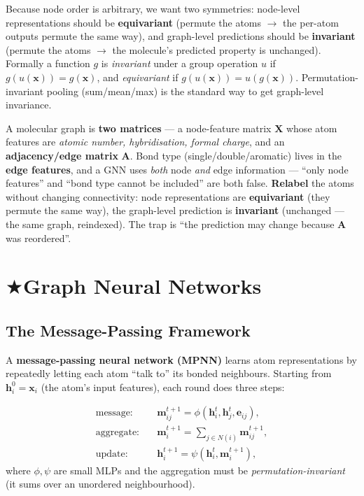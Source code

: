 \documentclass[11pt, oneside]{book}
\makeatletter
\newcommand{\starglyph}{\textcolor{stargold}{\ensuremath{\bigstar}}}
\newcommand{\starsec}[1]{%
  \texorpdfstring{\starglyph\hspace{0.4em}\textcolor{star@frame}{#1}}{#1}}
\newcommand{\xvec}{\mathbf{x}}
\makeatother
\begin{document}
Because node order is arbitrary, we want two symmetries: node-level
representations should be \textbf{equivariant} (permute the atoms $\to$ the
per-atom outputs permute the same way), and graph-level predictions should be
\textbf{invariant} (permute the atoms $\to$ the molecule's predicted property is
unchanged). Formally a function $g$ is \emph{invariant} under a group operation
$u$ if $g(u(\xvec)) = g(\xvec)$, and \emph{equivariant} if
$g(u(\xvec)) = u(g(\xvec))$. Permutation-invariant pooling (sum/mean/max) is the
standard way to get graph-level invariance.

\newpage

\begin{starbox}[title={Exam-critical: graphs in, symmetries out}]
A molecular graph is \textbf{two matrices} --- a node-feature matrix $\bm{X}$ whose
atom features are \emph{atomic number, hybridisation, formal charge}, and an
\textbf{adjacency/edge matrix} $\bm{A}$. Bond type (single/double/aromatic) lives in
the \textbf{edge features}, and a GNN uses \emph{both} node \emph{and} edge
information --- ``only node features'' and ``bond type cannot be included'' are both
false. \textbf{Relabel} the atoms without changing connectivity: node
representations are \textbf{equivariant} (they permute the same way), the
graph-level prediction is \textbf{invariant} (unchanged --- the same graph,
reindexed). The trap is ``the prediction may change because $\bm{A}$ was reordered''.
\end{starbox}

\section{\starsec{Graph Neural Networks}}

\subsection{The Message-Passing Framework}

A \textbf{message-passing neural network (MPNN)} learns atom representations by
repeatedly letting each atom ``talk to'' its bonded neighbours. Starting from
$\bm{h}_i^0 = \xvec_i$ (the atom's input features), each round does three steps:

\begin{thmbox}[title={Message passing (one layer)}]
\begin{align*}
\text{message:}\quad   & \bm{m}_{ij}^{t+1} = \phi\!\left(\bm{h}_i^t,\bm{h}_j^t,\bm{e}_{ij}\right),\\
\text{aggregate:}\quad & \bm{m}_i^{t+1} = \textstyle\sum_{j\in N(i)} \bm{m}_{ij}^{t+1},\\
\text{update:}\quad    & \bm{h}_i^{t+1} = \psi\!\left(\bm{h}_i^t,\bm{m}_i^{t+1}\right),
\end{align*}
where $\phi,\psi$ are small MLPs and the aggregation must be
\emph{permutation-invariant} (it sums over an unordered neighbourhood).
\end{thmbox}
\end{document}

